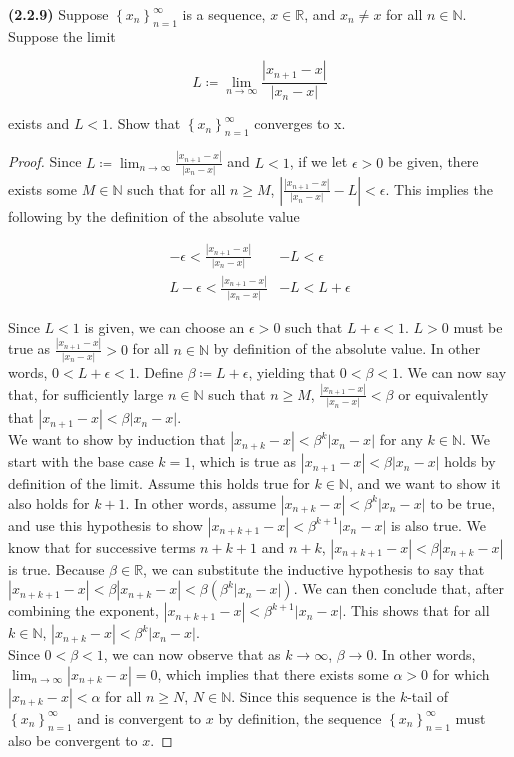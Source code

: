 \documentclass[12pt]{article}
\newcommand{\limtoinf}[1]{\lim_{ {#1} \to\infty}}
\newcommand{\abs}[1]{\left| {#1} \right|}
\newcommand{\seq}[2][n]{\left\{ {#2} \right\}_{#1=1}^\infty}
\newcommand{\paren}[1]{\left( {#1} \right)}
\newcommand{\bR}{\mathbb{R}}
\newcommand{\bN}{\mathbb{N}}
\begin{document}
\newpage

\noindent \textbf{(2.2.9)} Suppose $\seq{x_n}$ is a sequence, $x\in\bR$, and $x_n\neq x$ for all $n\in\bN$. Suppose the limit

\begin{equation*}
	L\coloneq\limtoinf{n}\frac{\abs{x_{n+1}-x}}{\abs{x_n-x}}
\end{equation*}

\noindent exists and $L<1$. Show that $\seq{x_n}$ converges to x.

\begin{proof}
	Since $L\coloneq\limtoinf{n}\frac{\abs{x_{n+1}-x}}{\abs{x_n-x}}$ and $L<1$, if we let $\epsilon>0$ be given, there exists some $M\in\bN$ such that for all $n\ge M$, $\abs{\frac{\abs{x_{n+1}-x}}{\abs{x_n-x}}-L}<\epsilon$. This implies the following by the definition of the absolute value
	
\begin{align*}
	-\epsilon<\frac{\abs{x_{n+1}-x}}{\abs{x_n-x}}&-L<\epsilon \\
	L-\epsilon<\frac{\abs{x_{n+1}-x}}{\abs{x_n-x}}&-L<L+\epsilon
\end{align*}

Since $L<1$ is given, we can choose an $\epsilon>0$ such that $L+\epsilon<1$. $L>0$ must be true as $\frac{\abs{x_{n+1}-x}}{\abs{x_n-x}}>0$ for all $n\in\bN$ by definition of the absolute value. In other words, $0<L+\epsilon<1$. Define $\beta\coloneq L+\epsilon$, yielding that $0<\beta<1$. We can now say that, for sufficiently large $n\in\bN$ such that $n\ge M$, $\frac{\abs{x_{n+1}-x}}{\abs{x_n-x}} < \beta$ or equivalently that $\abs{x_{n+1}-x}<\beta\abs{x_n-x}$. \\

\indent We want to show by induction that $\abs{x_{n+k}-x}<\beta^k\abs{x_{n}-x}$ for any $k\in\bN$. We start with the base case $k=1$, which is true as $\abs{x_{n+1}-x}<\beta\abs{x_{n}-x}$ holds by definition of the limit. Assume this holds true for $k\in\bN$, and we want to show it also holds for $k+1$. In other words, assume $\abs{x_{n+k}-x}<\beta^k\abs{x_{n}-x}$ to be true, and use this hypothesis to show $\abs{x_{n+k+1}-x}<\beta^{k+1}\abs{x_{n}-x}$ is also true. We know that for successive terms $n+k+1$ and $n+k$, $\abs{x_{n+k+1}-x}<\beta\abs{x_{n+k}-x}$ is true. Because $\beta\in\bR$, we can substitute the inductive hypothesis to say that $\abs{x_{n+k+1}-x}<\beta\abs{x_{n+k}-x}<\beta\paren{\beta^k\abs{x_n-x}}$. We can then conclude that, after combining the exponent, $\abs{x_{n+k+1}-x}<\beta^{k+1}\abs{x_{n}-x}$. This shows that for all $k\in\bN$, $\abs{x_{n+k}-x}<\beta^k\abs{x_{n}-x}$. \\

\indent Since $0<\beta<1$, we can now observe that as $k\to\infty$, $\beta\to0$. In other words, $\limtoinf{n}\abs{x_{n+k}-x}=0$, which implies that there exists some $\alpha>0$ for which $\abs{x_{n+k}-x}<\alpha$ for all $n\ge N$, $N\in\bN$. Since this sequence is the $k$-tail of $\seq{x_n}$ and is convergent to $x$ by definition, the sequence $\seq{x_n}$ must also be convergent to $x$. 

\end{proof}
\end{document}
